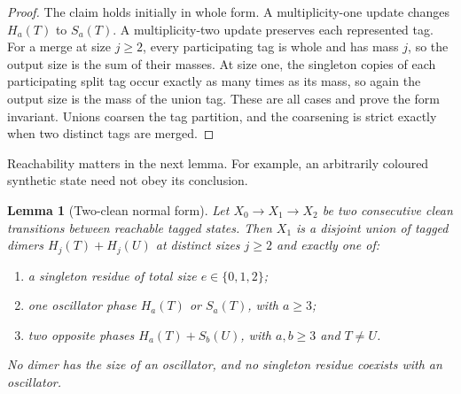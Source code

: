 \documentclass[10pt,a4paper]{amsart}
\newtheorem{lemma}[theorem]{Lemma}
\theoremstyle{definition}
\theoremstyle{remark}
\begin{document}
\begin{proof}
The claim holds initially in whole form.  A multiplicity-one update changes
$H_a(T)$ to $S_a(T)$.  A multiplicity-two update preserves each represented
tag.  For a merge at size $j\geq2$, every participating tag is whole and
has mass $j$, so the output size is the sum of their masses.  At size one,
the singleton copies of each participating split tag occur exactly as many
times as its mass, so again the output size is the mass of the union tag.
These are all cases and prove the form invariant.  Unions coarsen the tag
partition, and the coarsening is strict exactly when two distinct tags are
merged.
\end{proof}

Reachability matters in the next lemma.  For example, an arbitrarily
coloured synthetic state need not obey its conclusion.

\begin{lemma}[Two-clean normal form]\label{lem:normal}
Let $X_0\to X_1\to X_2$ be two consecutive clean transitions between
reachable tagged states.  Then $X_1$ is a disjoint union of tagged dimers
$H_j(T)+H_j(U)$ at distinct sizes $j\geq2$ and exactly one of:
\begin{enumerate}[label=\textup{(\alph*)}]
\item a singleton residue of total size $e\in\{0,1,2\}$;
\item one oscillator phase $H_a(T)$ or $S_a(T)$, with $a\geq3$;
\item two opposite phases $H_a(T)+S_b(U)$, with $a,b\geq3$ and $T\ne U$.
\end{enumerate}
No dimer has the size of an oscillator, and no singleton residue coexists
with an oscillator.
\end{lemma}
\end{document}
